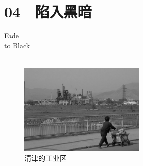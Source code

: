 \fancyhead[RO]{{\tiny{\textcolor{Gray}{\FA \ }}}\thepage}
\fancyhead[LE]{{\tiny{\textcolor{Gray}{\FA \ }}}\thepage}
\fancyfoot[LE,RO]{}
\fancyfoot[LO,CE]{}
\fancyfoot[CO,RE]{}
\chapter*{04 {\FA } 陷入黑暗}
\vspace{15mm}
\begin{flushright}
	\textcolor{PinYinColor}{\EN \huge{Fade\\
	to Black\\
	\ \\}}
\end{flushright}

\begin{figure}[!htbp]
	\centering
	\includegraphics[width=6cm]{./Chapters/Images/04.jpg}
	\caption*{清津的工业区}
\end{figure}

